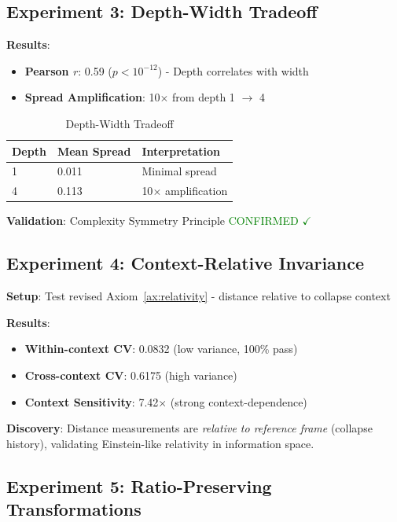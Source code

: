 \documentclass[11pt,a4paper]{article}
\begin{document}
\subsection{Experiment 3: Depth-Width Tradeoff}

\textbf{Results}:
\begin{itemize}
    \item \textbf{Pearson $r$}: 0.59 ($p < 10^{-12}$) - Depth correlates with width
    \item \textbf{Spread Amplification}: 10$\times$ from depth 1 $\to$ 4
\end{itemize}

\begin{table}[h]
\centering
\begin{tabular}{lll}
\toprule
\textbf{Depth} & \textbf{Mean Spread} & \textbf{Interpretation} \\
\midrule
1 & 0.011 & Minimal spread \\
4 & 0.113 & 10$\times$ amplification \\
\bottomrule
\end{tabular}
\caption{Depth-Width Tradeoff}
\end{table}

\textbf{Validation}: Complexity Symmetry Principle \textcolor{green}{CONFIRMED $\checkmark$}

\subsection{Experiment 4: Context-Relative Invariance}

\textbf{Setup}: Test revised Axiom~\ref{ax:relativity} - distance relative to collapse context

\textbf{Results}:
\begin{itemize}
    \item \textbf{Within-context CV}: 0.0832 (low variance, 100\% pass)
    \item \textbf{Cross-context CV}: 0.6175 (high variance)
    \item \textbf{Context Sensitivity}: 7.42$\times$ (strong context-dependence)
\end{itemize}

\textbf{Discovery}: Distance measurements are \emph{relative to reference frame} (collapse history), validating Einstein-like relativity in information space.

\subsection{Experiment 5: Ratio-Preserving Transformations}
\end{document}
